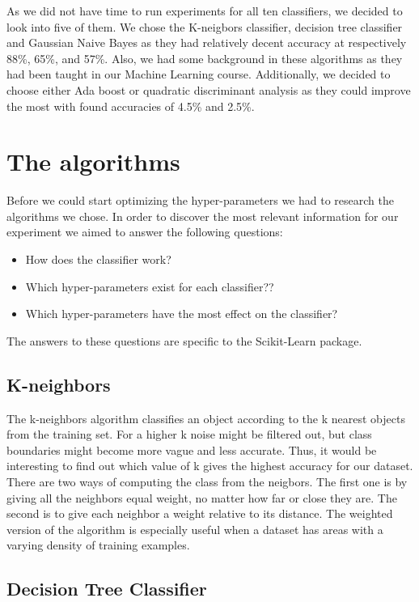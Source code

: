 \documentclass{article}
\begin{document}
	As we did not have time to run experiments for all ten classifiers, we decided to look into five of them. We chose the K-neigbors classifier, decision tree classifier and Gaussian Naive Bayes as they had relatively decent accuracy at respectively 88\%, 65\%, and 57\%. Also, we had some background in these algorithms as they had been taught in our Machine Learning course. Additionally, we decided to choose either Ada boost or quadratic discriminant analysis as they could improve the most with found accuracies of 4.5\% and 2.5\%. 

\newpage
\section{The algorithms}
	Before we could start optimizing the hyper-parameters we had to research the algorithms we chose. In order to discover the most relevant information for our experiment we aimed to answer the following questions:
	
	\begin{itemize}
		\item How does the classifier work? 
		\item Which hyper-parameters exist for each classifier??
		\item Which hyper-parameters have the most effect on the classifier?
	\end{itemize}
	
	The answers to these questions are specific to the Scikit-Learn package.
	
	\subsection{K-neighbors}
		The k-neighbors algorithm classifies an object according to the k nearest objects from the training set. For a higher k noise might be filtered out, but class boundaries might become more vague and less accurate. Thus, it would be interesting to find out which value of k gives the highest accuracy for our dataset. There are two ways of computing the class from the neigbors. The first one is by giving all the neighbors equal weight, no matter how far or close they are.  The second is to give each neighbor a weight relative to its distance. The weighted version of the algorithm is especially useful when a dataset has areas with a varying density of training examples. 
	
	\subsection{Decision Tree Classifier}
	
\end{document}
